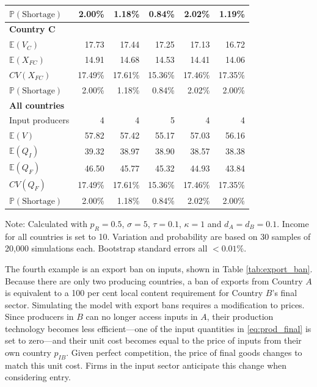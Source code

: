 \documentclass{article}
\begin{document}
\begin{table}
\begin{threeparttable}
\begin{tabular}{lrrrrr}
            $\mathbb{P}(\text{Shortage})$ & 2.00\% & 1.18\% & 0.84\% & 2.02\% & 1.19\% \\ 
            \midrule
            \textbf{Country C} \\
            $\mathbb{E}(V_C)$ & 17.73 & 17.44 & 17.25 & 17.13 & 16.72 \\
            $\mathbb{E}(X_{FC})$ & 14.91 & 14.68 & 14.53 & 14.41 & 14.06 \\
            $CV(X_{FC})$ & 17.49\% & 17.61\% & 15.36\% & 17.46\% & 17.35\% \\
            $\mathbb{P}(\text{Shortage})$ & 2.00\% & 1.18\% & 0.84\% & 2.02\% & 2.00\% \\ 
            \midrule
            \textbf{All countries} \\
            Input producers & 4 & 4 & 5 & 4 & 4 \\
            $\mathbb{E}(V)$ & 57.82 & 57.42 & 55.17 & 57.03 & 56.16 \\
            $\mathbb{E}(Q_I)$ & 39.32 & 38.97 & 38.90 & 38.57 & 38.38 \\
            $\mathbb{E}(Q_F)$ & 46.50 & 45.77 & 45.32 & 44.93 & 43.84 \\
            $CV(Q_F)$ & 17.49\% & 17.61\% & 15.36\% & 17.46\% & 17.35\% \\
            $\mathbb{P}(\text{Shortage})$ & 2.00\% &1.18\% & 0.84\% & 2.02\% & 2.00\% \\ 
            \bottomrule
        \end{tabular}
        \begin{tablenotes}
            \small \item Note: Calculated with $p_R = 0.5$, $\sigma = 5$, $\tau = 0.1$, $\kappa = 1$ and $d_A = d_B = 0.1$. Income for all countries is set to 10. Variation and probability are based on 30 samples of 20,000 simulations each. Bootstrap standard errors all $<0.01\%$.
        \end{tablenotes}
    \end{threeparttable}
\end{table}

The fourth example is an export ban on inputs, shown in Table \ref{tab:export_ban}. Because there are only two producing countries, a ban of exports from Country $A$ is equivalent to a 100 per cent local content requirement for Country $B$'s final sector. Simulating the model with export bans requires a modification to prices. Since producers in $B$ can no longer access inputs in $A$, their production technology becomes less efficient---one of the input quantities in \ref{eq:prod_final} is set to zero---and their unit cost becomes equal to the price of inputs from their own country $p_{IB}$. Given perfect competition, the price of final goods changes to match this unit cost. Firms in the input sector anticipate this change when considering entry.
\end{document}

